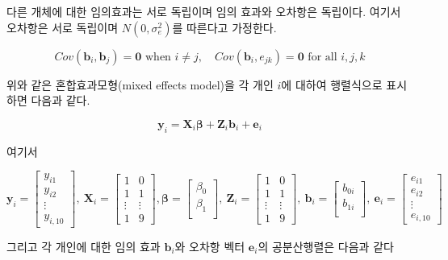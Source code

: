 \documentclass[
]{book}
\theoremstyle{definition}
\theoremstyle{definition}
\theoremstyle{definition}
\theoremstyle{remark}
\begin{document}
다른 개체에 대한 임의효과는 서로 독립이며 임의 효과와 오차항은 독립이다. 여기서 오차항은 서로 독립이며 \(N(0, \sigma^2_e)\)를 따른다고 가정한다.

\[ Cov(\bm b_{i}, \bm b_{j}) =\bm 0 \text{ when } i \ne j,\quad
Cov(\bm b_{i}, e_{jk}) =\bm 0 \text{ for all } i,j,k \]

위와 같은 혼합효과모형(mixed effects model)을 각 개인 \(i\)에 대하여 행렬식으로 표시하면 다음과 같다.

\begin{equation}
\bm y_i = \bm X_i \bm \beta + \bm Z_i \bm b_i + \bm e_i 
\label{eq:indilm}
\end{equation}

여기서

\[ 
\bm y_i=\left[ \begin{array}{c}
y_{i1} \\
y_{i2} \\
\vdots \\
y_{i,10}
\end{array} \right],~\bm X_i =
\left[ \begin{array}{cc}
1 & 0 \\
1 & 1 \\
\vdots & \vdots  \\
1 & 9 
\end{array} \right], \bm  \beta=
\left[ \begin{array}{c}
\beta_{0} \\
\beta_{1} \\
\end{array} \right], ~\bm Z_i =
\left[ \begin{array}{cc}
1 & 0 \\
1 & 1 \\
\vdots & \vdots  \\
1 & 9 
\end{array} \right],~ \bm b_i =
\left[ \begin{array}{c}
b_{0i} \\
b_{1i} \\
\end{array} \right],~
\bm  e_i= 
\left[ \begin{array}{c}
e_{i1} \\
e_{i2} \\
\vdots \\
e_{i,10}
\end{array} \right]
\]

그리고 각 개인에 대한 임의 효과 \(\bm b_i\)와 오차항 벡터 \(\bm e_i\)의 공분산행렬은 다음과 같다
\end{document}
